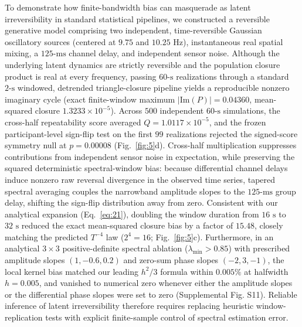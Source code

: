 \documentclass[aps,pre,reprint,amsmath,amssymb,superscriptaddress]{revtex4-2}
\begin{document}
To demonstrate how finite-bandwidth bias can masquerade as latent irreversibility in standard statistical pipelines, we constructed a reversible generative model comprising two independent, time-reversible Gaussian oscillatory sources (centered at $9.75$ and $10.25\text{ Hz}$), instantaneous real spatial mixing, a $125\text{-ms}$ channel delay, and independent sensor noise. Although the underlying latent dynamics are strictly reversible and the population closure product is real at every frequency, passing $60\text{-s}$ realizations through a standard $2\text{-s}$ windowed, detrended triangle-closure pipeline yields a reproducible nonzero imaginary cycle (exact finite-window maximum $|\mathrm{Im}(P)| = 0.04360$, mean-squared closure $1.3233 \times 10^{-5}$).
Across $500$ independent $60\text{-s}$ simulations, the cross-half repeatability score averaged $Q = 1.0117 \times 10^{-5}$, and the frozen participant-level sign-flip test on the first $99$ realizations rejected the signed-score symmetry null at $p = 0.00008$ (Fig.~\ref{fig:5}d). Cross-half multiplication suppresses contributions from independent sensor noise in expectation, while preserving the squared deterministic spectral-window bias: because differential channel delays induce nonzero raw reversal divergence in the observed time series, tapered spectral averaging couples the narrowband amplitude slopes to the $125\text{-ms}$ group delay, shifting the sign-flip distribution away from zero.
Consistent with our analytical expansion (Eq.~\eqref{eq:21}), doubling the window duration from $16\text{ s}$ to $32\text{ s}$ reduced the exact mean-squared closure bias by a factor of $15.48$, closely matching the predicted $T^{-4}$ law ($2^4 = 16$; Fig.~\ref{fig:5}c). Furthermore, in an analytical $3 \times 3$ positive-definite spectral ablation ($\lambda_{\min} > 0.85$) with prescribed amplitude slopes $(1, -0.6, 0.2)$ and zero-sum phase slopes $(-2, 3, -1)$, the local kernel bias matched our leading $h^2/3$ formula within $0.005\%$ at halfwidth $h = 0.005$, and vanished to numerical zero whenever either the amplitude slopes or the differential phase slopes were set to zero (Supplemental Fig. S11). Reliable inference of latent irreversibility therefore requires replacing heuristic window-replication tests with explicit finite-sample control of spectral estimation error.
\end{document}
